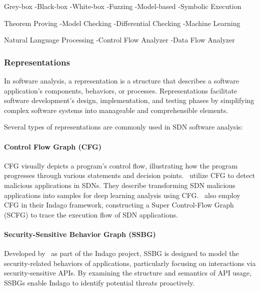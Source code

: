 \begin{table}[ht!]
\begin{adjustbox}{width=\linewidth,center}
\begin{threeparttable}
\begin{tabular}{l||cccccccccccc}
            \end{tabular}
            \begin{tablenotes}
                \item \> [GB] Grey-box -\> [BB] Black-box -\> [WB] White-box -\> [FZ] Fuzzing -\> [MB] Model-based -\> [SE] Symbolic Execution
                \item \> [TP] Theorem Proving -\> [MC] Model Checking -\> [DC] Differential Checking -\> [ML] Machine Learning 
                \item \> [NLP] Natural Language Processing -\> [CFA] Control Flow Analyzer -\> [DFA] Data Flow Analyzer     
            \end{tablenotes}
        \end{threeparttable}
    \end{adjustbox}
\end{table}


\subsubsection{Representations}
In software analysis, a representation is a structure that describes a software application's components, behaviors, or processes. Representations facilitate software development's design, implementation, and testing phases by simplifying complex software systems into manageable and comprehensible elements.

Several types of representations are commonly used in SDN software analysis:

\paragraph{Control Flow Graph (CFG)} CFG visually depicts a program's control flow, illustrating how the program progresses through various statements and decision points.~\cite{10.1007/978-981-13-6508-9_13} utilize CFG to detect malicious applications in SDNs. They describe transforming SDN malicious applications into samples for deep learning analysis using CFG.~\cite{8526819} also employ CFG in their Indago framework, constructing a Super Control-Flow Graph (SCFG) to trace the execution flow of SDN applications.

\paragraph{Security-Sensitive Behavior Graph (SSBG)} Developed by~\cite{8526819} as part of the Indago project, SSBG is designed to model the security-related behaviors of applications, particularly focusing on interactions via security-sensitive APIs. By examining the structure and semantics of API usage, SSBGs enable Indago to identify potential threats proactively.

